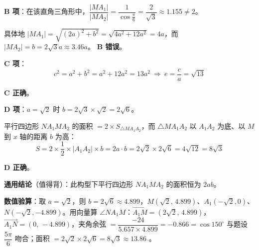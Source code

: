 \begin{answer}
\textbf{B 项}：在该直角三角形中，$\dfrac{|MA_1|}{|MA_2|}=\dfrac1{\cos\frac\pi6}=\dfrac{2}{\sqrt3}\approx1.155\ne2$。

具体地 $|MA_1|=\sqrt{(2a)^2+b^2}=\sqrt{4a^2+12a^2}=4a$，而 $|MA_2|=b=2\sqrt3a\approx3.46a$。 \textbf{B 错误}。

\textbf{C 项}：
\nopagebreak[4]
\[c^2=a^2+b^2=a^2+12a^2=13a^2\ \Longrightarrow\ e=\frac ca=\sqrt{13}\]

 \textbf{C 正确}。

\textbf{D 项}：$a=\sqrt2$ 时 $b=2\sqrt3\times\sqrt2=2\sqrt6$。

平行四边形 $NA_1MA_2$ 的面积 $=2\times S_{\triangle MA_1A_2}$，而 $\triangle MA_1A_2$ 以 $A_1A_2$ 为底、以 $M$ 到 $x$ 轴的距离 $b$ 为高：
\nopagebreak[4]
\[S=2\times\frac12\times|A_1A_2|\times b=2a\cdot b=2\sqrt2\times2\sqrt6=4\sqrt{12}=8\sqrt3\]

 \textbf{D 正确}。

\begin{gktip}
\textbf{通用结论}（值得背）：此构型下平行四边形 $NA_1MA_2$ 的面积恒为 $2ab$。

\textbf{数值验算}：取 $a=\sqrt2$，则 $b=2\sqrt6\approx4.899$，$M\left(\sqrt2,\,4.899\right)$、$A_1\left(-\sqrt2,0\right)$、$N\left(-\sqrt2,-4.899\right)$。用向量算 $\angle NA_1M$：$\overrightarrow{A_1M}=(2\sqrt2,\,4.899)$，$\overrightarrow{A_1N}=(0,\,-4.899)$，夹角余弦 $=\dfrac{-24}{5.657\times4.899}=-0.866=\cos150^\circ$  与题设 $\dfrac{5\pi}{6}$ 吻合；面积 $=2\sqrt2\times2\sqrt6=8\sqrt3\approx13.86$ 。
\end{gktip}


\par\medskip

\end{answer}

